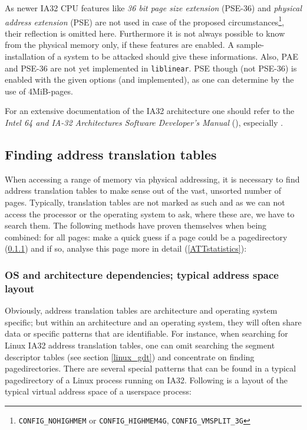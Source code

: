 As newer IA32 CPU features like \emph{36 bit page size extension} (PSE-36) and
\emph{physical address extension} (PSE) are not used in case of the proposed
circumstances\footnote{\texttt{CONFIG\_NOHIGHMEM} or \texttt{CONFIG\_HIGHMEM4G},
\texttt{CONFIG\_VMSPLIT\_3G}}, their reflection is omitted here.  Furthermore it
is not always possible to know from the physical memory only, if these features
are enabled.  A sample-installation of a system to be attacked should give these
informations.  Also, PAE and PSE-36 are not yet implemented in
\texttt{liblinear}. PSE though (not PSE-36) is enabled with the given options
(and implemented), as one can determine by the use of 4MiB-pages.

For an extensive documentation of the IA32 architecture one should refer to the
\emph{Intel 64 and IA-32 Architectures Software Developer's Manual}
(\cite{IA32_SDM_1:2006,IA32_SDM_2a:2006,IA32_SDM_2b:2006,IA32_SDM_3a:2006,IA32_SDM_3b:2006}),
especially \cite{IA32_SDM_3a:2006}.



\subsection{Finding address translation tables}
\label{findingATT}

When accessing a range of memory via physical addressing, it is necessary to
find address translation tables to make sense out of the vast, unsorted number
of pages. Typically, translation tables are not marked as such and as we can not
access the processor or the operating system to ask, where these are, we have to
search them. The following methods have proven themselves when being combined:
for all pages: make a quick guess if a page could be a pagedirectory
(\ref{ATTguess}) and if so, analyse this page more in detail
(\ref{ATTstatistics}):



\subsubsection{OS and architecture dependencies; typical address space layout}

\label{ATTguess} Obviously, address translation tables are architecture and
operating system specific; but within an architecture and an operating system,
they will often share data or specific patterns that are identifiable. For
instance, when searching for Linux IA32 address translation tables, one can omit
searching the segment descriptor tables (see section \ref{linux_gdt}) and
concentrate on finding pagedirectories. There are several special patterns that
can be found in a typical pagedirectory of a Linux process running on IA32.
Following is a layout of the typical virtual address space of a userspace
process:

